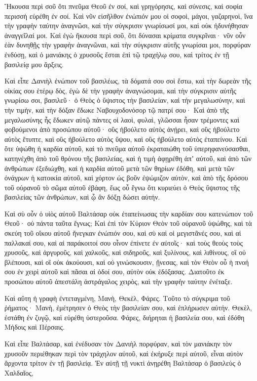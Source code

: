{Ἤκουσα περὶ σοῦ ὅτι πνεῦμα Θεοῦ ἐν σοί, καὶ γρηγόρησις, καὶ σύνεσις, καὶ σοφία περισσὴ εὑρέθη ἐν σοί.
Καὶ νῦν εἰσῆλθον ἐνώπιόν μου οἱ σοφοὶ, μάγοι, γαζαρηνοὶ, ἵνα τὴν γραφὴν ταύτην ἀναγνῶσι, καὶ τὴν σύγκρισιν γνωρίσωσί μοι, καὶ οὐκ ἠδυνήθησαν ἀναγγεῖλαί μοι.
Καὶ ἐγὼ ἤκουσα περὶ σοῦ, ὅτι δύνασαι κρίματα συγκρῖναι· νῦν οὖν ἐὰν δυνηθῇς τὴν γραφὴν ἀναγνῶναι, καὶ τὴν σύγκρισιν αὐτῆς γνωρίσαι μοι, πορφύραν ἐνδύσῃ, καὶ ὁ μανιάκης ὁ χρυσοῦς ἔσται ἐπὶ τῷ τραχήλῳ σου, καὶ τρίτος ἐν τῇ βασιλείᾳ μου ἄρξεις.
\par }{\PP {}Καὶ εἶπε Δανιὴλ ἐνώπιον τοῦ βασιλέως, τὰ δόματά σου σοὶ ἔστω, καὶ τὴν δωρεὰν τῆς οἰκίας σου ἑτέρῳ δὸς, ἐγὼ δὲ τὴν γραφὴν ἀναγνώσομαι, καὶ τὴν σύγκρισιν αὐτῆς γνωρίσω σοι,
βασιλεῦ· ὁ Θεὸς ὁ ὕψιστος τὴν βασιλείαν, καὶ τὴν μεγαλωσύνην, καὶ τὴν τιμὴν, καὶ τὴν δόξαν ἔδωκε Ναβουχοδονόσορ τῷ πατρί σου·
Καὶ ἀπὸ τῆς μεγαλωσύνης ἧς ἔδωκεν αὐτῷ πάντες οἱ λαοὶ, φυλαὶ, γλῶσσαι ἦσαν τρέμοντες καὶ φοβούμενοι ἀπὸ προσώπου αὐτοῦ· οὓς ἠβούλετο αὐτὸς ἀνῄρει, καὶ οὓς ἠβούλετο αὐτὸς ἔτυπτε, καὶ οὓς ἠβούλετο αὐτὸς ὕψου, καὶ οὓς ἠβούλετο αὐτὸς ἐταπείνου.
Καὶ ὅτε ὑψώθη ἡ καρδία αὐτοῦ, καὶ τὸ πνεῦμα αὐτοῦ ἐκραταιώθη τοῦ ὑπερηφανεύσασθαι, κατηνέχθη ἀπὸ τοῦ θρόνου τῆς βασιλείας, καὶ ἡ τιμὴ ἀφῃρέθη ἀπʼ αὐτοῦ,
καὶ ἀπὸ τῶν ἀνθρώπων ἐξεδιώχθη, καὶ ἡ καρδία αὐτοῦ μετὰ τῶν θηρίων ἐδόθη, καὶ μετὰ τῶν ὀνάγρων ἡ κατοικία αὐτοῦ, καὶ χόρτον ὡς βοῦν ἐψώμιζον αὐτὸν, καὶ ἀπὸ τῆς δρόσου τοῦ οὐρανοῦ τὸ σῶμα αὐτοῦ ἐβάφη, ἕως οὗ ἔγνω ὅτι κυριεύει ὁ Θεὸς ὕψιστος τῆς βασιλείας τῶν ἀνθρώπων, καὶ ᾧ ἂν δόξῃ δώσει αὐτήν.
\par }{\PP {}Καὶ σὺ οὖν ὁ υἱὸς αὐτοῦ Βαλτάσαρ οὐκ ἐταπείνωσας τὴν καρδίαν σου κατενώπιον τοῦ Θεοῦ· οὐ πάντα ταῦτα ἔγνως;
Καὶ ἐπὶ τὸν Κύριον Θεὸν τοῦ οὐρανοῦ ὑψώθης, καὶ τὰ σκεύη τοῦ οἴκου αὐτοῦ ἤνεγκαν ἐνώπιόν σου, καὶ σὺ καὶ οἱ μεγιστᾶνές σου, καὶ αἱ παλλακαί σου, καὶ αἱ παράκοιτοί σου οἶνον ἐπίνετε ἐν αὐτοῖς· καὶ τοὺς θεοὺς τοὺς χρυσοῦς, καὶ ἀργυροῦς, καὶ χαλκοῦς, καὶ σιδηροῦς, καὶ ξυλίνους, καὶ λιθίνους, οἳ οὐ βλέπουσι, καὶ οἳ οὐκ ἀκούουσι, καὶ οὐ γινώσκουσιν, ᾔνεσας, καὶ τὸν Θεὸν οὗ ἡ πνοή σου ἐν χειρὶ αὐτοῦ καὶ πᾶσαι αἱ ὁδοί σου, αὐτὸν οὐκ ἐδόξασας.
Διατοῦτο ἐκ προσώπου αὐτοῦ ἀπεστάλη ἀστράγαλος χειρὸς, καὶ τὴν γραφὴν ταύτην ἐνέταξε.
\par }{\PP {}Καὶ αὕτη ἡ γραφὴ ἐντεταγμένη, Μανὴ, Θεκὲλ, Φάρες.
Τοῦτο τὸ σύγκριμα τοῦ ῥήματος· Μανὴ, ἐμέτρησεν ὁ Θεὸς τὴν βασιλείαν σου, καὶ ἐπλήρωσεν αὐτήν.
Θεκὲλ, ἐστάθη ἐν ζυγῷ, καὶ εὑρέθη ὑστεροῦσα.
Φάρες, διήρηται ἡ βασιλεία σου, καὶ ἐδόθη Μήδοις καὶ Πέρσαις.
\par }{\PP {}Καὶ εἶπε Βαλτάσαρ, καὶ ἐνέδυσαν τὸν Δανιὴλ πορφύραν, καὶ τὸν μανιάκην τὸν χρυσοῦν περιέθηκαν περὶ τὸν τράχηλον αὐτοῦ, καὶ ἐκήρυξε περὶ αὐτοῦ, εἶναι αὐτὸν ἄρχοντα τρίτον ἐν τῇ βασιλείᾳ.
Ἐν αὐτῇ τῇ νυκτὶ ἀνῃρέθη Βαλτάσαρ ὁ βασιλεὺς ὁ Χαλδαῖος,

}
